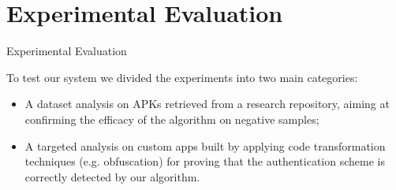 \documentclass[10pt]{beamer}
\begin{document}




 
 


\section{Experimental Evaluation}
\begin{frame}[fragile]{Experimental Evaluation}

  To test our system we divided the experiments into two main categories:
  \begin{itemize}

  \item A dataset analysis on APKs retrieved from a research
    repository, aiming at confirming the efficacy of the
    algorithm on negative samples;

  \item A targeted analysis on custom apps built by applying code
    transformation techniques (e.g. obfuscation) for proving that the
    authentication scheme is correctly detected by our algorithm.
      
  \end{itemize}
	
\end{frame}
\end{document}
